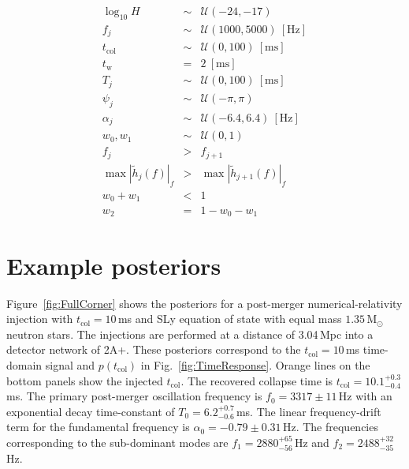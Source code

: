 \documentclass[
reprint,
prd,
twocolumn,
nofootinbib,
 amsmath,
showpacs ,amssymb, aps,%
superscriptaddress
]{revtex4-1}
\newcommand{\tc}{t_{\mathrm{col}}}
\newcommand{\tw}{t_{\mathrm{w}}}
\newcommand{\msun}{\mathrm{M}_{\odot}}
\begin{document}
    \begin{eqnarray}
        \log_{10}{H} & \sim & \mathcal{U}(-24, -17)\label{eq:firstprior}  \\
        f_j & \sim & \mathcal{U}(1000,5000)\  [\mathrm{Hz}]\\
        \tc & \sim & \mathcal{U}(0,100)\  [\mathrm{ms}]\\
        \tw & = & 2\  [\mathrm{ms}]\\
        T_j & \sim & \mathcal{U}(0,100)\ [\mathrm{ms}]\\
        \psi_j & \sim & \mathcal{U}(-\pi,\pi) \\
        \alpha_j & \sim & \mathcal{U}(-6.4,6.4)\   [\mathrm{Hz}] \\
        w_0, w_1 & \sim & \mathcal{U}(0,1)\label{eq:lastprior}\\
        f_{j}  & > & f_{j+1}\label{eq:freqsorting}\\
        \max|\tilde{h}_{j}(f)|_f & > & \max|\tilde{h}_{j+1}(f)|_f \label{eq:modesorting}\\
        w_0+w_1 & < & 1  \label{eq:w01}\\
        w_2 & = & 1 - w_0 - w_1 \label{eq:w2}
    \end{eqnarray}
    \onecolumngrid
    \vfill\null 
    \pagebreak
    
\section{Example posteriors}
\label{appendix:b}
    \vspace{-0.3cm}
    Figure~\ref{fig:FullCorner} shows the posteriors for a post-merger numerical-relativity injection with $\tc=10\,$ms and SLy equation of state with equal mass $1.35\,\msun$ neutron stars. The injections are performed at a distance of 3.04\,Mpc into a detector network of 2A+.
    These posteriors correspond to the $\tc=10\,$ms time-domain signal and $p(\tc)$ in Fig.~\ref{fig:TimeResponse}.
    Orange lines on the bottom panels show the injected $\tc$.
    The recovered collapse time is $\tc=10.1^{+0.3}_{-0.4}\,$ms. 
    The primary post-merger oscillation frequency is $f_0=3317\pm 11\,$Hz with an exponential decay time-constant of $T_0=6.2_{-0.6}^{+ 0.7}\,$ms. 
    The linear frequency-drift term for the fundamental frequency is $\alpha_0=-0.79\pm 0.31\,$Hz. The frequencies corresponding to the sub-dominant modes are $f_1=2880^{+65}_{-56}\,$Hz and $f_2=2488^{+32}_{-35}\,$Hz. 
\end{document}
